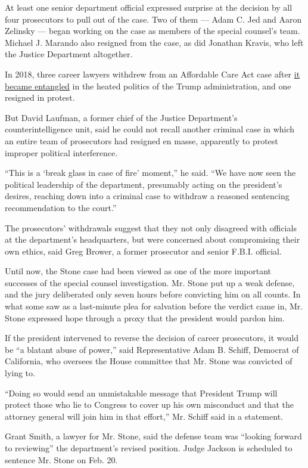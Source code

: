 At least one senior department official expressed surprise at the
decision by all four prosecutors to pull out of the case. Two of them
--- Adam C. Jed and Aaron Zelinsky --- began working on the case as
members of the special counsel's team. Michael J. Marando also resigned
from the case, as did Jonathan Kravis, who left the Justice Department
altogether.

In 2018, three career lawyers withdrew from an Affordable Care Act case
after
\href{https://www.nytimes.com/2018/10/19/us/politics/jeff-sessions-justice-department.html}{it
became entangled} in the heated politics of the Trump administration,
and one resigned in protest.

But David Laufman, a former chief of the Justice Department's
counterintelligence unit, said he could not recall another criminal case
in which an entire team of prosecutors had resigned en masse, apparently
to protest improper political interference.

``This is a `break glass in case of fire' moment,'' he said. ``We have
now seen the political leadership of the department, presumably acting
on the president's desires, reaching down into a criminal case to
withdraw a reasoned sentencing recommendation to the court.''

The prosecutors' withdrawals suggest that they not only disagreed with
officials at the department's headquarters, but were concerned about
compromising their own ethics, said Greg Brower, a former prosecutor and
senior F.B.I. official.

Until now, the Stone case had been viewed as one of the more important
successes of the special counsel investigation. Mr. Stone put up a weak
defense, and the jury deliberated only seven hours before convicting him
on all counts. In what some saw as a last-minute plea for salvation
before the verdict came in, Mr. Stone expressed hope through a proxy
that the president would pardon him.

If the president intervened to reverse the decision of career
prosecutors, it would be ``a blatant abuse of power,'' said
Representative Adam B. Schiff, Democrat of California, who oversees the
House committee that Mr. Stone was convicted of lying to.

``Doing so would send an unmistakable message that President Trump will
protect those who lie to Congress to cover up his own misconduct and
that the attorney general will join him in that effort,'' Mr. Schiff
said in a statement.

Grant Smith, a lawyer for Mr. Stone, said the defense team was ``looking
forward to reviewing'' the department's revised position. Judge Jackson
is scheduled to sentence Mr. Stone on Feb. 20.

